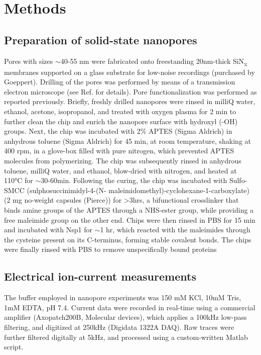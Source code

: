 \section{Methods}
\subsection{Preparation of solid-state nanopores}
Pores with sizes $\sim$40-55 nm were fabricated onto freestanding 20nm-thick SiN\textsubscript{x} membranes supported on a glass substrate for low-noise recordings (purchased by Goeppert). Drilling of the pores was performed by means of a transmission electron microscope (see Ref.\cite{VanDenHout2010} for details). Pore functionalization was performed as reported previously\cite{Fragasso2021}. Briefly, freshly drilled nanopores were rinsed in milliQ water, ethanol, acetone, isopropanol, and treated with oxygen plasma for 2 min to further clean the chip and enrich the nanopore surface with hydroxyl (-OH) groups. Next, the chip was incubated with 2\% APTES (Sigma Aldrich) in anhydrous toluene (Sigma Aldrich) for 45 min, at room temperature, shaking at 400 rpm, in a glove-box filled with pure nitrogen, which prevented APTES molecules from polymerizing. The chip was subsequently rinsed in anhydrous toluene, milliQ water, and ethanol, blow-dried with nitrogen, and heated at 110°C for $\sim$30-60min. Following the curing, the chip was incubated with Sulfo-SMCC (sulphosuccinimidyl-4-(N- maleimidomethyl)-cyclohexane-1-carboxylate) (2 mg no-weight capsules (Pierce)) for >3hrs, a bifunctional crosslinker that binds amine groups of the APTES through a NHS-ester group, while providing a free maleimide group on the other end. Chips were then rinsed in PBS for 15 min and incubated with Nsp1 for $\sim$1 hr, which reacted with the maleimides through the cysteine present on its C-terminus, forming stable covalent bonds. The chips were finally rinsed with PBS to remove unspecifically bound proteins

\subsection{Electrical ion-current measurements}
The buffer employed in nanopore experiments was 150 mM KCl, 10mM Tris, 1mM EDTA, pH 7.4. Current data were recorded in real-time using a commercial amplifier (Axopatch200B, Molecular devices), which applies a 100kHz low-pass filtering, and digitized at 250kHz (Digidata 1322A DAQ). Raw traces were further filtered digitally at 5kHz, and processed using a custom-written Matlab script\cite{Plesa2015a}.

